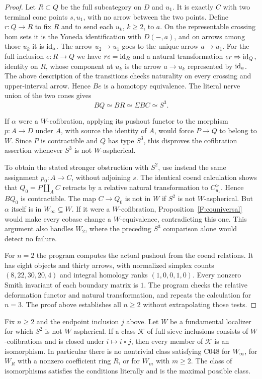 \begin{proof}
Let $R\subset Q$ be the full subcategory on $D$ and $u_1$.
It is exactly $C$ with two terminal cone points $s,u_1$,
with no arrow between the two points. Define $r:Q\to R$
to fix $R$ and to send each $u_k$, $k\geq2$, to $a$.
On the representable crossing hom sets it is the Yoneda
identification with $D(-,a)$, and on arrows among those
$u_k$ it is $\mathrm{id}_a$. The arrow $u_2\to u_1$ goes to the
unique arrow $a\to u_1$. For the full inclusion $e:R\to Q$
we have $re=\mathrm{id}_R$ and a natural transformation
$er\Rightarrow\mathrm{id}_Q$, identity on $R$, whose component
at $u_k$ is the arrow $a\to u_k$ represented by $\mathrm{id}_a$.
The above description of the transitions checks naturality
on every crossing and upper-interval arrow. Hence $Be$ is
a homotopy equivalence. The literal nerve union of the two
cones gives
\[
 BQ\simeq BR\simeq\Sigma BC\simeq S^3.
\]

If $\alpha$ were a $W$-cofibration, applying its pushout
functor to the morphism $p:A\to D$ under $A$, with source
the identity of $A$, would force $P\to Q$ to belong to
$W$. Since $P$ is contractible and $Q$ has type $S^3$,
this disproves the cofibration assertion whenever $S^3$
is not $W$-aspherical.

To obtain the stated stronger obstruction with $S^2$,
use instead the same assignment $p_0:A\to C$, without
adjoining $s$. The identical coend calculation shows
that $Q_0=P\amalg_A C$ retracts by a relative natural
transformation to $C^{\triangleright}_{u_1}$. Hence
$BQ_0$ is contractible. The map $C\to Q_0$ is not
in $W$ if $S^2$ is not $W$-aspherical. But $\alpha$
itself is in $W_\infty\subseteq W$. If it were a
$W$-cofibration, Proposition~\ref{F:couniversal}
would make every cobase change a $W$-equivalence,
contradicting this one. This argument also handles
$W_2$, where the preceding $S^3$ comparison alone
would detect no failure.

For $n=2$ the program computes the actual pushout from the
coend relations. It has eight objects and thirty arrows,
with normalized simplex counts $(8,22,30,20,4)$ and integral
homology ranks $(1,0,0,1,0)$. Every nonzero Smith invariant
of each boundary matrix is $1$. The program checks the
relative deformation functor and natural transformation,
and repeats the calculation for $n=3$. The proof above
establishes all $n\geq2$ without extrapolating those tests.
\end{proof}

\begin{theorem}
\label{F:interval-impossibility}
Fix $n\geq2$ and the endpoint inclusion $j$ above. Let $W$
be a fundamental localizer for which $S^2$ is not
$W$-aspherical. If a class $\mathcal K$ of full sieve
inclusions consists of $W$-cofibrations and is closed under
$i\mapsto i\mathbin{\square}j$, then every member of
$\mathcal K$ is an isomorphism. In particular there is no
nontrivial class satisfying C048 for $W_\infty$, for
$W_R$ with a nonzero coefficient ring $R$, or for $W_m$
with $m\geq2$. The class of isomorphisms satisfies the
conditions literally and is the maximal possible class.
\end{theorem}

